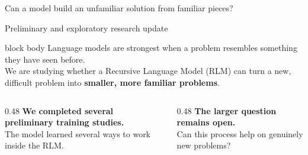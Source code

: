 \documentclass[aspectratio=169,11pt]{beamer}
\begin{document}
\begin{frame}[plain]
  \vspace{0.15cm}
  {\color{RlmNavy}
    Can a model build an unfamiliar solution from familiar pieces?\par}

  \vspace{0.15cm}
  {\color{RlmMuted}
    Preliminary and exploratory research update\par}

  \vspace{0.4cm}
  \begin{beamercolorbox}[wd=\linewidth,sep=.7em,rounded=true]{block body}
    \centering
    \large
    Language models are strongest when a problem resembles something they have seen before.\\[0.45em]
    We are studying whether a Recursive Language Model (RLM) can turn a new, difficult problem
    into \textbf{smaller, more familiar problems}.
  \end{beamercolorbox}

  \vfill
  \begin{columns}[T,onlytextwidth]
    \begin{column}{0.48\textwidth}
      \centering
      {\color{RlmTeal}\textbf{We completed several preliminary training studies.}}\\[0.25em]
      The model learned several ways to work inside the RLM.
    \end{column}
    \begin{column}{0.48\textwidth}
      \centering
      {\color{RlmGold}\textbf{The larger question remains open.}}\\[0.25em]
      Can this process help on genuinely new problems?
    \end{column}
  \end{columns}
\end{frame}
\end{document}
